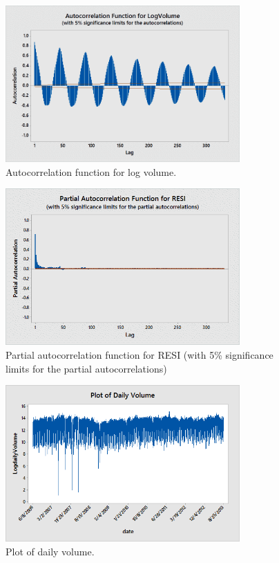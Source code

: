         \begin{figure}[!ht]
        \centering
        \includegraphics[width=0.8\textwidth]{chapters/chapter_stat_ts/figures/logvol.png}
        \caption{Autocorrelation function for log volume. \label{fig:logvolumeauto}}
        \end{figure}
        \begin{figure}[!ht]
        \centering
        \includegraphics[width=0.8\textwidth]{chapters/chapter_stat_ts/figures/resi.png}
        \caption{Partial autocorrelation function for RESI (with 5\% significance limits for the partial autocorrelations) \label{fig:partresi}}
        \end{figure}
        \begin{figure}[!ht]
        \centering
        \includegraphics[width=0.8\textwidth]{chapters/chapter_stat_ts/figures/dailyvol.png}
        \caption{Plot of daily volume. \label{fig:dailyvol}}
        \end{figure}


